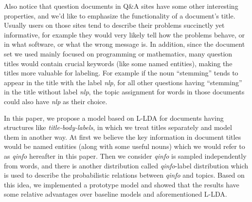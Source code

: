 
Also notice that question documents in Q\&A sites have some other interesting properties, and we'd like to emphasize the functionality of a document's title. Usually users on those sites tend to describe their problems succinctly yet informative, for example they would very likely tell how the problems behave, or in what software, or what the wrong message is. In addition, since the document set we used mainly focused on programming or mathematics, many question titles would contain crucial keywords (like some named entities), making the titles more valuable for labeling. For example if the noun ``stemming'' tends to appear in the title with the label \emph{nlp}, for all other questions having ``stemming'' in the title without label \emph{nlp}, the topic assignment for words in those documents could also have \emph{nlp} as their choice.

In this paper, we propose a model based on L-LDA for documents having structures like \emph{title-body-labels}, in which we treat titles separately and model them in another way. At first we believe the key information in document titles would be named entities (along with some useful nouns) which we would refer to as \emph{qinfo} hereafter in this paper. Then we consider \emph{qinfo} is sampled independently from words, and there is another distribution called \emph{qinfo}-label distribution which is used to describe the probabilistic relations between \emph{qinfo} and topics. Based on this idea, we implemented a prototype model and showed that the results have some relative advantages over baseline models and aforementioned L-LDA.
